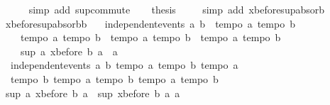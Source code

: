 \begin{isabellebody}
\ \ \ \ \isamarkupfalse%
\ {\isacharparenleft}simp\ add{\isacharcolon}\ sup{\isachardot}commute{\isacharparenright}\isanewline
\ \ \isamarkupfalse%
\ {\isacharquery}thesis\ \isamarkupfalse%
\ {}\ \isamarkupfalse%
\ {\isacharparenleft}simp\ add{\isacharcolon}\ xbefore{\isacharunderscore}sup{\isacharunderscore}absorb{\isacharunderscore}{}{\isacharparenright}\isanewline
{}\isamarkupfalse%
%
\endisatagproof
{\isafoldproof}%
%
\isadelimproof
\isanewline
%
\endisadelimproof
\isanewline
{}\isamarkupfalse%
\ xbefore{\isacharunderscore}sup{\isacharunderscore}absorb{\isacharunderscore}{}b{\isacharcolon}\ \isanewline
\ \ {\isachardoublequoteopen}independent{\isacharunderscore}events\ a\ b\ {\isasymLongrightarrow}\ {\isasymlbrakk}tempo{}\ a{\isacharsemicolon}\ tempo{}\ b{\isasymrbrakk}\ {\isasymLongrightarrow}\ \isanewline
\ \ \ \ {\isasymlbrakk}tempo{}\ a{\isacharsemicolon}\ tempo{}\ b{\isasymrbrakk}\ {\isasymLongrightarrow}\ {\isasymlbrakk}tempo{}\ a{\isacharsemicolon}\ tempo{}\ b{\isasymrbrakk}\ {\isasymLongrightarrow}\ {\isasymlbrakk}tempo{}\ a{\isacharsemicolon}\ tempo{}\ b{\isasymrbrakk}\ {\isasymLongrightarrow}\isanewline
\ \ \ \ sup\ a\ {\isacharparenleft}xbefore\ b\ a{\isacharparenright}\ {\isacharequal}\ a{\isachardoublequoteclose}\isanewline
%
\isadelimproof
%
\endisadelimproof
%
\isatagproof
{}\isamarkupfalse%
{\isacharminus}\isanewline
\ \ \isamarkupfalse%
\ {}{\isacharcolon}\ {\isachardoublequoteopen}independent{\isacharunderscore}events\ a\ b{\isachardoublequoteclose}\ {\isachardoublequoteopen}tempo{}\ a{\isachardoublequoteclose}\ {\isachardoublequoteopen}tempo{}\ b{\isachardoublequoteclose}\ {\isachardoublequoteopen}tempo{}\ a{\isachardoublequoteclose}\ \isanewline
\ \ {\isachardoublequoteopen}tempo{}\ b{\isachardoublequoteclose}\ {\isachardoublequoteopen}tempo{}\ a{\isachardoublequoteclose}\ {\isachardoublequoteopen}tempo{}\ b{\isachardoublequoteclose}\ {\isachardoublequoteopen}tempo{}\ a{\isachardoublequoteclose}\ {\isachardoublequoteopen}tempo{}\ b{\isachardoublequoteclose}\isanewline
\ \ \isamarkupfalse%
\ {\isachardoublequoteopen}sup\ a\ {\isacharparenleft}xbefore\ b\ a{\isacharparenright}\ {\isacharequal}\ sup\ {\isacharparenleft}xbefore\ b\ a{\isacharparenright}\ a{\isachardoublequoteclose}\ \isanewline

\end{isabellebody}
